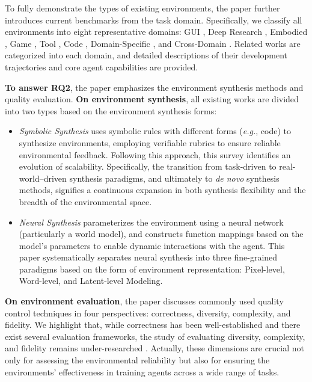 To fully demonstrate the types of existing environments, the paper further introduces current benchmarks from the task domain. Specifically, we classify all environments into eight representative domains: GUI \cite{WorkArena, OSWorld, WebShop}, Deep Research \cite{SimpleQA, GAIA, BrowseComp}, Embodied \cite{ALFRED, ALFWorld, ScienceWorld}, Game \cite{GameArena, BabaIsAI, GAMEBENCH}, Tool \cite{ToolBench, tau-bench, API-Bank}, Code \cite{MBPP, Terminal-Bench, KernelBench}, Domain-Specific \cite{MedAgentBench, ScienceAgentBench, DSBench}, and Cross-Domain \cite{Openai_gym, GEM, AgentBench}. Related works are categorized into each domain, and detailed descriptions of their development trajectories and core agent capabilities are provided.

\textbf{To answer RQ2}, the paper emphasizes the environment synthesis methods and quality evaluation. \textbf{On environment synthesis}, all existing works are divided into two types based on the environment synthesis forms: 

\begin{itemize}

\item \textit{Symbolic Synthesis} uses symbolic rules with different forms (\textit{e.g.}, code) to synthesize environments, employing verifiable rubrics to ensure reliable environmental feedback. Following this approach, this survey identifies an evolution of scalability.
Specifically, the transition from task-driven to real-world–driven synthesis paradigms, and ultimately to \textit{de novo} synthesis methods, signifies a continuous expansion in both synthesis flexibility and the breadth of the environmental space.
\item \textit{Neural Synthesis} parameterizes the environment using a neural network (particularly a world model), and constructs function mappings based on the model's parameters to enable dynamic interactions with the agent. This paper systematically separates neural synthesis into three fine-grained paradigms based on the form of environment representation: Pixel-level, Word-level, and Latent-level Modeling.

\end{itemize}

\textbf{On environment evaluation}, the paper discusses commonly used quality control techniques in four perspectives: correctness, diversity, complexity, and fidelity. We highlight that, while correctness has been well-established and there exist several evaluation frameworks, the study of evaluating diversity, complexity, and fidelity remains under-researched \cite{AgentsCourt, MMR-V, MMR-Life}. Actually, these dimensions are crucial not only for assessing the environmental reliability but also for ensuring the environments' effectiveness in training agents across a wide range of tasks.



